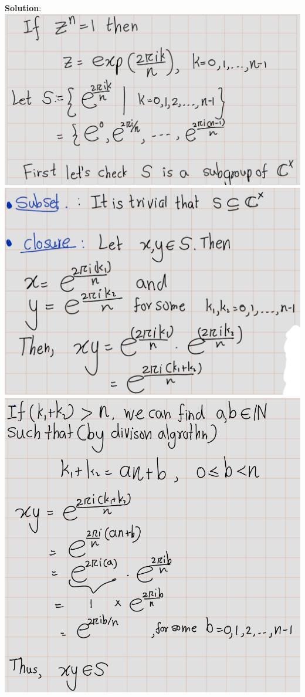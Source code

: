 \documentclass[
]{book}
\theoremstyle{definition}
\theoremstyle{definition}
\theoremstyle{definition}
\theoremstyle{definition}
\theoremstyle{remark}
\begin{document}
\textbf{Solution}:
\includegraphics{figures/ch_2/fig23.png}
\includegraphics{figures/ch_2/fig24.png}
\includegraphics{figures/ch_2/fig25.png}
\end{document}
